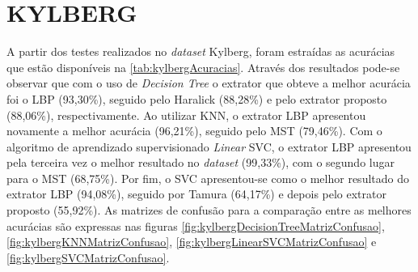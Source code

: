 \section{KYLBERG}
\label{sec:kylberg}

\par A partir dos testes realizados no \textit{dataset} Kylberg, foram estraídas as acurácias que estão disponíveis na \autoref{tab:kylbergAcuracias}. Através dos resultados pode-se observar que com o uso de \textit{Decision Tree} o extrator que obteve a melhor acurácia foi o LBP (93,30\%), seguido pelo Haralick (88,28\%) e pelo extrator proposto (88,06\%), respectivamente. Ao utilizar KNN, o extrator LBP apresentou novamente a melhor acurácia (96,21\%), seguido pelo MST (79,46\%). Com o algoritmo de aprendizado supervisionado \textit{Linear} SVC, o extrator LBP apresentou pela terceira vez o melhor resultado no \textit{dataset} (99,33\%), com o segundo lugar para o MST (68,75\%). Por fim, o SVC apresentou-se como o melhor resultado do extrator LBP (94,08\%), seguido por Tamura (64,17\%) e depois pelo extrator proposto (55,92\%). As matrizes de confusão para a comparação entre as melhores acurácias são expressas nas figuras \ref{fig:kylbergDecisionTreeMatrizConfusao}, \ref{fig:kylbergKNNMatrizConfusao}, \ref{fig:kylbergLinearSVCMatrizConfusao} e \ref{fig:kylbergSVCMatrizConfusao}.



